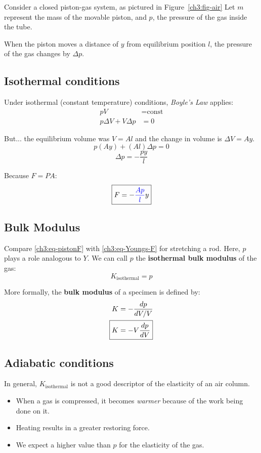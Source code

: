 Consider a closed piston-gas system, as pictured in Figure~\ref{ch3:fig-air} Let $m$ represent the mass of the movable piston, and $p$, the pressure of the gas inside the tube.

When the piston moves a distance of $y$ from equilibrium position $l$, the pressure of the gas changes by $\Delta p$.

\subsection{Isothermal conditions}
Under {isothermal} (constant temperature) conditions, \emph{Boyle's Law} applies:
\begin{align*}
pV &= \text{const} \\
p\Delta V + V\Delta p &= 0 \tag*{(cf. the product rule for differentiation)}
\end{align*}

But... the equilibrium volume was $V = Al$ and the change in volume is $\Delta V = Ay$.
\[ p(Ay) + (Al)\Delta p = 0 \]
\[ \Delta p = -\frac{py}{l} \]

Because $F=PA$:
\begin{equation}
	\boxed{F=-\textcolor{blue}{\frac{Ap}{l}} y } \label{ch3:eq-pistonF}
\end{equation}

\subsection{Bulk Modulus} \label{ch3:sec-bulk-modulus}

Compare \eqref{ch3:eq-pistonF} with \eqref{ch3:eq-Youngs-F} for stretching a rod. Here, $p$ plays a role analogous to $Y$. We can call $p$ the \textbf{isothermal bulk modulus} of the gas:
\begin{equation*}
	K_\text{isothermal} = p
\end{equation*}

More formally, the \textbf{bulk modulus} of a specimen is defined by:
\begin{align*}
	K &= -\frac{dp}{dV/V} \notag \\
	\Aboxed{K &= -V\frac{dp}{dV}}
\end{align*}

\subsection{Adiabatic conditions}

In general, $K_\text{isothermal}$ is not a good descriptor of the elasticity of an air column.
\begin{itemize}
	\item When a gas is compressed, it becomes \emph{warmer} because of the work being done on it.
	\item Heating results in a greater restoring force.
	\item We expect a higher value than $p$ for the elasticity of the gas.
\end{itemize}

